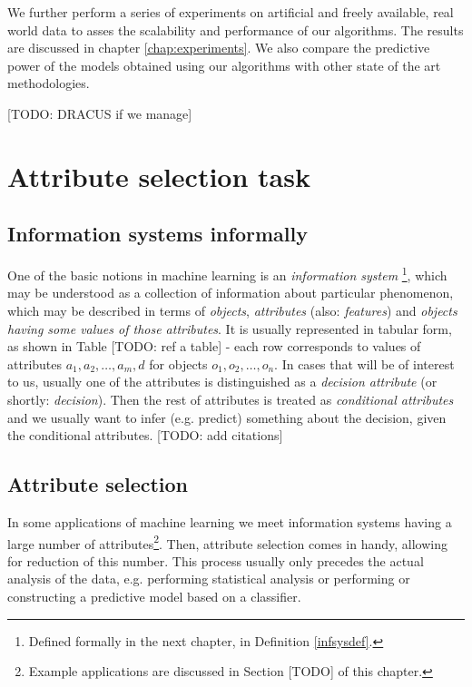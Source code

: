 \documentclass[12pt]{pracamgr}
\begin{document}
We further perform a series of experiments on artificial and freely available, real world data to asses the scalability and performance of our algorithms. The results are discussed in chapter \ref{chap:experiments}. We also compare the predictive power of the models obtained using our algorithms with other state of the art methodologies.

[TODO: DRACUS if we manage]

\chapter{Attribute selection task}
\label{chap:attrsel}

\section{Information systems informally}

One of the basic notions in machine learning is an \emph{information system}
\footnote{Defined formally in the next chapter, in Definition \ref{infsysdef}.}, which may 
be understood as a collection of information about particular phenomenon, which may be 
described in terms of \emph{objects}, \emph{attributes} (also: \emph{features}) and 
\emph{objects having some values of those attributes}. It is usually represented in tabular 
form, as shown in Table [TODO: ref a table] - each row corresponds to values of attributes 
$a_1, a_2, \dots, a_m, d$ for objects $o_1, o_2, \dots, o_n$. In cases that will be of 
interest to us, usually one of the attributes is distinguished as a \emph{decision 
attribute} (or shortly: \emph{decision}). Then the rest of attributes is treated as 
\emph{conditional attributes} and we usually want to infer (e.g. predict) something about 
the decision, given the conditional attributes. [TODO: add citations]

\section{Attribute selection}

In some applications of machine learning we meet information systems having a large number 
of attributes\footnote{Example applications are discussed in Section [TODO] of this 
chapter.}. Then, attribute selection comes in handy, allowing for reduction of this number. 
This process usually only precedes the actual analysis of the data, e.g. performing 
statistical analysis or performing or constructing a predictive model based on a classifier.
\end{document}
